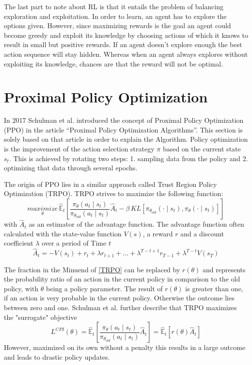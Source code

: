 The last part to note about RL is that it entails the problem of balancing exploration and exploitation. In order to learn, an agent has to explore the options given. However, since maximizing rewards is the goal an agent could become greedy and exploit its knowledge by choosing actions of which it knows to result in small but positive rewards. If an agent doesn't explore enough the best action sequence will stay hidden. Whereas when an agent always explores without exploiting its knowledge, chances are that the reward will not be optimal.

\section{Proximal Policy Optimization}
In 2017 Schulman et al. introduced the concept of Proximal Policy Optimization (PPO) in
the article ``Proximal Policy Optimization Algorithms''\cite{scwo17}.
This section is solely based on that article in order to explain the Algorithm.
Policy optimization is the improvement of the action selection strategy $\pi$ based on the
current state $s_{t}$. This is achieved by rotating two steps: 1. sampling data from the policy and 2.
optimizing that data through several epochs.

The origin of PPO lies in a similar approach called Trust Region Policy Optimization (TRPO).
TRPO strives to maximize the following function:
\begin{equation}\label{TRPO}
    \underset{\theta}{maximize}\,\hat{\mathbb{E}}_{t} [\frac{\pi_{\theta}(a_{t} \mid s_{t})}{\pi_{\theta_{old}}(a_{t} \mid s_{t})}
    \hat{A}_{t}-\beta \, KL[\pi_{\theta_{old}}(\cdot \mid s_{t}),\pi_{\theta}(\cdot \mid s_{t})]]
\end{equation}
with $\hat{A}_{t}$ as an estimator of the advantage function. The advantage function often calculated with the
state-value function $V(s)$, a reward $r$ and a discount coefficient $\lambda$ over a period of Time $t$
\begin{equation}\label{advantage}
    \hat{A}_{t} = -V(s_{t})+r_{t}+\lambda r_{t+1}+ \ldots + \lambda^{T-t+1} r_{T-1} + \lambda^{T-t} V(s_{T})
\end{equation}

The fraction in the Minuend of \eqref{TRPO} can be replaced by
$r(\theta)$ %
and represents the probability ratio of an
action in the current policy in comparison to the old policy, with $\theta$ being a policy parameter.
The result of $r(\theta)$ is greater than
one, if an action is very probable in the current policy. Otherwise the outcome lies between zero and one.
Schulman et al. further describe that TRPO maximizes the "surrogate" objective
\begin{equation}\label{TRPO surrogate}
    L^{CPI}(\theta) = \hat{\mathbb{E}}_{t}[ \frac{\pi_{\theta}(a_{t} \mid s_{t})}{\pi_{\theta_{old}}(a_{t} \mid s_{t})} \hat{A}_{t}]
    = \hat{\mathbb{E}}_{t}[r(\theta)\hat{A}_{t}]
\end{equation}
However, maximized on its own without a penalty this results in a large outcome and leads to drastic
policy updates.

